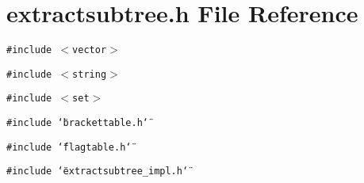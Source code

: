 \section{extractsubtree.h File Reference}
\label{extractsubtree_8h}
{\tt \#include $<$vector$>$}\par
{\tt \#include $<$string$>$}\par
{\tt \#include $<$set$>$}\par
{\tt \#include \char`\"{}brackettable.h\char`\"{}}\par
{\tt \#include \char`\"{}flagtable.h\char`\"{}}\par
{\tt \#include \char`\"{}extractsubtree\_\-impl.h\char`\"{}}\par

